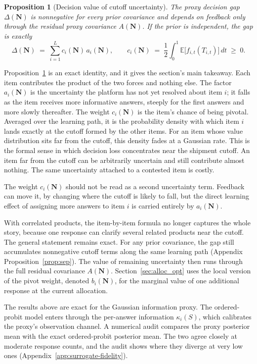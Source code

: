\documentclass[11pt]{article}
\newtheorem{proposition}[theorem]{Proposition}
\theoremstyle{definition}
\theoremstyle{remark}
\newcommand{\E}{\mathbb{E}}
\newcommand{\1}{\mathbf{1}}
\newcommand{\N}{\mathbf{N}}
\begin{document}
\begin{proposition}[Decision value of cutoff uncertainty]
\label{prop:gaussian-gap}
The proxy decision gap \(\Delta(\N)\) is nonnegative for every prior
covariance and depends on feedback only through the residual proxy
covariance \(A(\N)\). If the prior is independent, the gap is exactly
\[
\Delta(\N)
\;=\;
\sum_{i=1}^L c_i(\N)\,a_i(\N),
\qquad
c_i(\N)
\;=\;
\frac12\int_0^1 \E\!\big[f_{i,t}(T_{i,t})\big]\,dt
\;\ge\;0.
\]
\end{proposition}

Proposition~\ref{prop:gaussian-gap} is an exact identity, and it gives
the section's main takeaway. Each item contributes the product of
the two forces and nothing else. The factor \(a_i(\N)\) is the
uncertainty the platform has not yet resolved about item \(i\); it
falls as the item receives more informative answers, steeply for the
first answers and more slowly thereafter. The weight \(c_i(\N)\) is the
item's chance of being pivotal. Averaged over the learning path, it is
the probability density with which item \(i\) lands exactly at the
cutoff formed by the other items. For an item whose value distribution
sits far from the cutoff, this density fades at a Gaussian rate. This
is the formal sense in which decision loss concentrates near the
shipment cutoff. An item far from the cutoff can be arbitrarily uncertain and still contribute almost nothing. The same uncertainty attached to a contested item is costly.

The weight \(c_i(\N)\) should not be read as a second uncertainty term.
Feedback can move it, by changing where the cutoff is likely to fall,
but the direct learning effect of assigning more answers to item \(i\)
is carried entirely by \(a_i(\N)\).

With correlated products, the item-by-item formula no longer captures
the whole story, because one response can clarify several related
products near the cutoff. The general statement remains exact. For any
prior covariance, the gap still accumulates nonnegative cutoff terms
along the same learning path (Appendix Proposition~\ref{prop:sep}). The
value of remaining uncertainty then runs through the full residual
covariance \(A(\N)\).
Section~\ref{sec:alloc_opt} uses the local version of the pivot weight,
denoted \(b_i(\N)\), for the marginal value of one additional response
at the current allocation.

The results above are exact for the Gaussian information proxy. The
ordered-probit model enters through the per-answer information
\(\kappa_i(S)\), which calibrates the proxy's observation channel. A
numerical audit compares the proxy posterior mean with the exact
ordered-probit posterior mean. The two agree closely at moderate
response counts, and the audit shows where they diverge at very low ones
(Appendix~\ref{app:surrogate-fidelity}).
\end{document}
